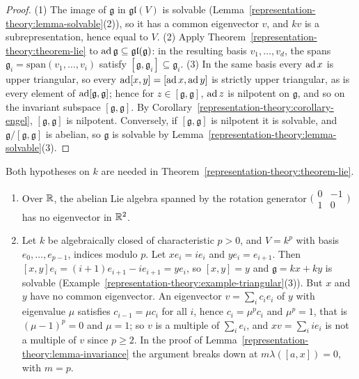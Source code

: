 \begin{proof}
(1) The image of $\mathfrak{g}$ in $\mathfrak{gl}(V)$ is solvable (Lemma~\ref{representation-theory:lemma-solvable}(2)), so it has a common eigenvector $v$, and $kv$ is a
subrepresentation, hence equal to $V$. (2) Apply Theorem~\ref{representation-theory:theorem-lie} to $\operatorname{ad}\mathfrak{g} \subseteq \mathfrak{gl}(\mathfrak{g})$: in the
resulting basis $v_1, \ldots, v_d$, the spans $\mathfrak{g}_i = \mathrm{span}(v_1, \ldots, v_i)$ satisfy $[\mathfrak{g}, \mathfrak{g}_i] \subseteq \mathfrak{g}_i$. (3) In
the same basis every $\operatorname{ad} x$ is upper triangular, so every $\operatorname{ad}[x, y] = [\operatorname{ad} x, \operatorname{ad} y]$ is strictly upper triangular, as is every element of
$\operatorname{ad}[\mathfrak{g}, \mathfrak{g}]$; hence for $z \in [\mathfrak{g}, \mathfrak{g}]$, $\operatorname{ad} z$ is nilpotent on $\mathfrak{g}$, and so on the invariant subspace
$[\mathfrak{g}, \mathfrak{g}]$. By Corollary~\ref{representation-theory:corollary-engel}, $[\mathfrak{g}, \mathfrak{g}]$ is nilpotent. Conversely, if
$[\mathfrak{g}, \mathfrak{g}]$ is nilpotent it is solvable, and $\mathfrak{g}/[\mathfrak{g}, \mathfrak{g}]$ is abelian, so $\mathfrak{g}$ is solvable by
Lemma~\ref{representation-theory:lemma-solvable}(3).
\end{proof}

\begin{counterexample}\label{representation-theory:counterexample-lie}
Both hypotheses on $k$ are needed in Theorem~\ref{representation-theory:theorem-lie}.
\begin{enumerate}
\item Over $\mathbb{R}$, the abelian Lie algebra spanned by the rotation generator $\bigl(\begin{smallmatrix} 0 & -1\\ 1 & 0\end{smallmatrix}\bigr)$ has no eigenvector in
$\mathbb{R}^2$.
\item Let $k$ be algebraically closed of characteristic $p > 0$, and $V = k^p$ with basis $e_0, \ldots, e_{p-1}$, indices modulo $p$. Let $xe_i = ie_i$ and
$ye_i = e_{i+1}$. Then $[x, y]e_i = (i + 1)e_{i+1} - ie_{i+1} = ye_i$, so $[x, y] = y$ and $\mathfrak{g} = kx + ky$ is solvable
(Example~\ref{representation-theory:example-triangular}(3)). But $x$ and $y$ have no common eigenvector. An eigenvector $v = \sum_ic_ie_i$ of $y$ with eigenvalue $\mu$
satisfies $c_{i-1} = \mu c_i$ for all $i$, hence $c_i = \mu^{p}c_i$ and $\mu^p = 1$, that is $(\mu - 1)^p = 0$ and $\mu = 1$; so $v$ is a multiple of
$\sum_ie_i$, and $xv = \sum_iie_i$ is not a multiple of $v$ since $p \geq 2$. In the proof of Lemma~\ref{representation-theory:lemma-invariance} the argument
breaks down at $m\lambda([a, x]) = 0$, with $m = p$.
\end{enumerate}
\end{counterexample}

